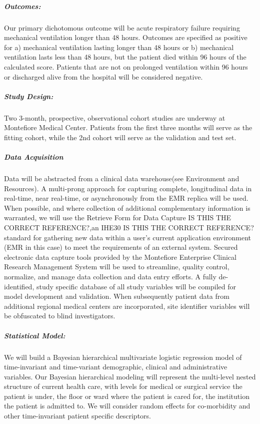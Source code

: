 \documentclass[11pt,notitlepage]{article}
\begin{document}
\subparagraph*{Outcomes:}
Our primary dichotomous outcome will be acute respiratory failure requiring mechanical ventilation longer than 48 hours. Outcomes are specified as positive for a) mechanical ventilation lasting longer than 48 hours or b) mechanical ventilation lasts less than 48 hours, but the patient died within 96 hours of the calculated score. Patients that are not on prolonged ventilation within 96 hours or discharged alive from the hospital will be considered negative.

\subparagraph*{Study Design:}
Two 3-month, prospective, observational cohort studies are underway at Montefiore Medical Center. Patients from the first three months will serve as the fitting cohort, while the 2nd cohort will serve as the validation and test set.

\subparagraph*{Data Acquisition}
Data will be abstracted from a clinical data warehouse(see Environment and Resources). A multi-prong approach for capturing complete, longitudinal data in real-time, near real-time, or asynchronously from the EMR replica will be used. When possible, and where collection of additional complementary information is warranted, we will use the Retrieve Form for Data Capture IS THIS THE CORRECT REFERENCE?\cite{Rothenhaeusler_2005},an IHE30 IS THIS THE CORRECT REFERENCE? \cite{Rotte_15809512} standard for gathering new data within a user's current application environment (EMR in this case) to meet the requirements of an external system. Secured electronic data capture tools provided by the Montefiore Enterprise Clinical Research Management System will be used to streamline, quality control, normalize, and manage data collection and data entry efforts. A fully de-identified, study specific database of all study variables will be compiled for model development and validation. When subsequently patient data from additional regional medical centers are incorporated, site identifier variables will be obfuscated to blind investigators.

\subparagraph*{Statistical Model:}
We will build a Bayesian hierarchical multivariate logistic regression model of time-invariant and time-variant demographic, clinical  and administrative variables. Our Bayesian hierarchical modeling will represent the multi-level nested structure of current health care, with levels for medical or surgical service the patient is under, the floor or ward where the patient is cared for, the institution the patient is admitted to. We will consider random effects for co-morbidity and other time-invariant patient specific descriptors. 
\end{document}
